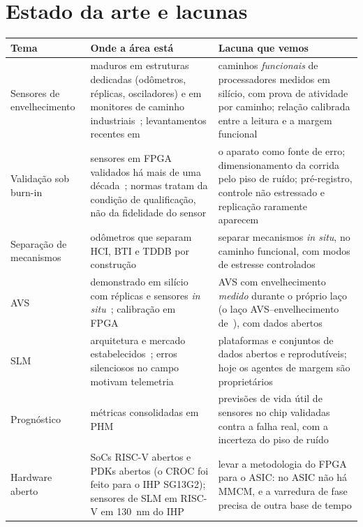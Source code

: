 \documentclass[11pt,a4paper]{article}
\begin{document}
\section{Estado da arte e lacunas}\label{sec:gaps}

\begin{tabularx}{\textwidth}{@{}>{\raggedright\arraybackslash}p{2.8cm} Y Y@{}}
\toprule
Tema & Onde a área está & Lacuna que vemos \\ \midrule
Sensores de envelhecimento & maduros em estruturas dedicadas (odômetros, réplicas, osciladores) e em monitores de
caminho industriais~\cite{kim2008odometer,drake2007cpm,synopsysPMM}; levantamentos recentes em~\cite{babu2025extending,juracy2020survey} &
caminhos \emph{funcionais} de processadores medidos em silício, com prova de atividade por caminho; relação calibrada entre
a leitura e a margem funcional \\
Validação sob burn-in & sensores em FPGA validados há mais de uma década~\cite{valdespena2013,amouri2014aging,sobas2024finfet};
normas tratam da condição de qualificação, não da fidelidade do sensor & o aparato como fonte de erro; dimensionamento da
corrida pelo piso de ruído; pré-registro, controle não estressado e replicação raramente
aparecem~\cite{alencar2026sbcci,alencar2027dt} \\
Separação de mecanismos & odômetros que separam HCI, BTI e TDDB por construção~\cite{keane2010odometer} & separar
mecanismos \emph{in situ}, no caminho funcional, com modos de estresse controlados \\
AVS & demonstrado em silício com réplicas e sensores \emph{in situ}~\cite{bowman2011resilient,saliva2015fdsoi};
calibração em FPGA~\cite{niemann2020avs} & AVS com envelhecimento \emph{medido} durante o próprio laço (o laço
AVS--envelhecimento de~\cite{xie2026agingavs}), com dados abertos \\
SLM & arquitetura e mercado estabelecidos~\cite{kashyap2021slm,tahoori2024future}; erros silenciosos no campo motivam
telemetria~\cite{hochschild2021cores,dixit2021sdc} & plataformas e conjuntos de dados abertos e reprodutíveis; hoje os
agentes de margem são proprietários \\
Prognóstico & métricas consolidadas em PHM~\cite{saxena2008metrics} & previsões de vida útil de sensores no chip validadas
contra a falha real, com a incerteza do piso de ruído \\
Hardware aberto & SoCs RISC-V abertos e PDKs abertos (o CROC foi feito para o IHP SG13G2); sensores de SLM em RISC-V em
130~nm do IHP~\cite{vargas2025slmcore} & levar a metodologia do FPGA para o ASIC: no ASIC não há MMCM, e a varredura de fase
precisa de outra base de tempo \\
\bottomrule
\end{tabularx}
\end{document}
